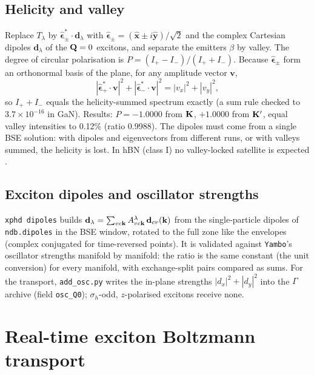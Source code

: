 \subsection{Helicity and valley}
Replace $T_\lambda$ by $\hat{\boldsymbol\epsilon}_\pm^{*}\cdot\mathbf{d}_\lambda$ with
$\hat{\boldsymbol\epsilon}_\pm=(\hat{\mathbf{x}}\pm i\hat{\mathbf{y}})/\sqrt2$ and the
complex Cartesian dipoles $\mathbf{d}_\lambda$ of the $\mathbf{Q}=0$ excitons, and
separate the emitters $\beta$ by valley. The degree of circular polarisation is
$P=(I_+-I_-)/(I_++I_-)$. Because $\hat{\boldsymbol\epsilon}_\pm$ form an
orthonormal basis of the plane, for any amplitude vector $\mathbf{v}$,
\begin{equation}
|\hat{\boldsymbol\epsilon}_+^{*}\cdot\mathbf{v}|^2+|\hat{\boldsymbol\epsilon}_-^{*}\cdot\mathbf{v}|^2
=|v_x|^2+|v_y|^2 ,
\end{equation}
so $I_++I_-$ equals the helicity-summed spectrum exactly (a sum rule checked to
$3.7\times10^{-16}$ in GaN). Results: $P=-1.0000$ from $\mathbf{K}$, $+1.0000$ from $\mathbf{K}'$,
equal valley intensities to 0.12\% (ratio 0.9988). The dipoles must come from a
single BSE solution: with dipoles and eigenvectors from different runs, or with
valleys summed, the helicity is lost. In hBN (class I) no valley-locked
satellite is expected .

\subsection{Exciton dipoles and oscillator strengths}
\texttt{xphd dipoles} builds $\mathbf{d}_\lambda=\sum_{vc\mathbf{k}}A^{\lambda}_{vc\mathbf{k}}\,
\mathbf{d}_{cv}(\mathbf{k})$ from the single-particle dipoles of \texttt{ndb.dipoles}
in the BSE window, rotated to the full zone like the envelopes (complex
conjugated for time-reversed points). It is validated against
\texttt{Yambo}'s oscillator strengths manifold by manifold: the ratio is the same
constant (the unit conversion) for every manifold, with exchange-split pairs
compared as sums. For the transport, \texttt{add\_osc.py} writes the in-plane
strengths $|d_x|^2+|d_y|^2$ into the $\Gamma$ archive (field \texttt{osc\_Q0});
$\sigma_h$-odd, $z$-polarised excitons receive none.

\section{Real-time exciton Boltzmann transport}
\label{sec:bte}

